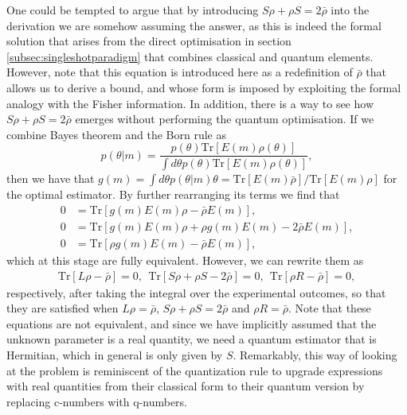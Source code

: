 One could be tempted to argue that by introducing $S \rho + \rho S = 2 \bar{\rho}$ into the derivation we are somehow assuming the answer, as this is indeed the formal solution that arises from the direct optimisation in section \ref{subsec:singleshotparadigm} that combines classical and quantum elements. However, note that this equation is introduced here as a redefinition of $\bar{\rho}$ that allows us to derive a bound, and whose form is imposed by exploiting the formal analogy with the Fisher information. In addition, there is a way to see how $S \rho + \rho S = 2 \bar{\rho}$ emerges without performing the quantum optimisation. If we combine Bayes theorem and the Born rule as
\begin{equation}
p(\theta|m) = \frac{p(\theta)\mathrm{Tr}[E(m)\rho(\theta)]}{\int d\theta p(\theta)\mathrm{Tr}\left[E(m)\rho(\theta)\right]},
\end{equation}
then we have that $g(m) = \int d\theta p(\theta|m)\theta = \mathrm{Tr}[E(m)\bar{\rho}]/\mathrm{Tr}[E(m)\rho]$ for the optimal estimator. By further rearranging its terms we find that 
\begin{align}
0 &= \mathrm{Tr}\left[g(m)E(m) \rho - \bar{\rho}E(m)  \right],
\nonumber \\
0 &= \mathrm{Tr}\left[g(m)E(m) \rho + \rho g(m)E(m) - 2\bar{\rho}E(m) \right],
\nonumber \\
0 &= \mathrm{Tr}\left[\rho g(m)E(m) - \bar{\rho}E(m) \right],
\end{align}
which at this stage are fully equivalent. However, we can rewrite them as
\begin{eqnarray}
\mathrm{Tr}\left[L \rho - \bar{\rho}  \right] = 0, ~~ \mathrm{Tr}\left[S \rho + \rho S - 2\bar{\rho} \right]  = 0, ~~ \mathrm{Tr}\left[\rho R - \bar{\rho} \right] = 0,
\end{eqnarray}
respectively, after taking the integral over the experimental outcomes, so that they are satisfied when $L \rho = \bar{\rho}$, $S\rho + \rho S = 2\bar{\rho}$ and $\rho R = \bar{\rho}$. Note that these equations are not equivalent, and since we have implicitly assumed that the unknown parameter is a real quantity, we need a quantum estimator that is Hermitian, which in general is only given by $S$. Remarkably, this way of looking at the problem is reminiscent of the quantization rule to upgrade expressions with real quantities from their classical form to their quantum version by replacing c-numbers with q-numbers.

